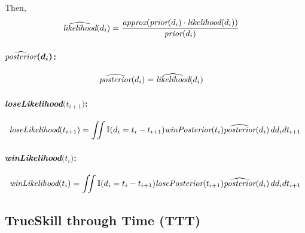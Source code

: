 \documentclass[article]{jss}
\begin{document}
Then, 
\begin{equation}
\begin{split}
\widehat{\emph{likelihood}}(d_i) &= \frac{\emph{approx}(\emph{prior}(d_i) \cdot \emph{likelihood}(d_i))}{ \emph{prior}(d_i)}
\end{split}
\end{equation}

\paragraph{$\bm{\widehat{\emph{posterior}}(d_i)}$:}


\begin{equation}
\begin{split}
\widehat{\emph{posterior}}(d_i) &= \widehat{\emph{likelihood}}(d_i)
\end{split}
\end{equation}

\paragraph{\emph{loseLikelihood}$\bm(t_{i+1})$:}

\begin{equation}
 \begin{split}
  \emph{loseLikelihood}(t_{i+1}) = \iint \mathbb{I}(d_{i} = t_i - t_{i+1} ) \emph{winPosterior}(t_i) \widehat{\emph{posterior}}(d_i) \, dd_idt_{i+1} 
 \end{split}
\end{equation}


\paragraph{\emph{winLikelihood}$\bm(t_{i})$:}

\begin{equation}
 \begin{split}
  \emph{winLikelihood}(t_{i}) = \iint \mathbb{I}(d_{i} = t_i - t_{i+1} ) \emph{losePosterior}(t_{i+1}) \widehat{\emph{posterior}}(d_i) \, dd_idt_{i+1} 
 \end{split}
\end{equation}





\subsection{TrueSkill through Time (TTT)}
\end{document}
